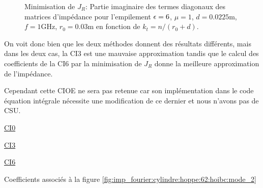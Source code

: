   \begin{figure}[!hbt]
    \centering
    
    \caption[CIOE sur empilement de Hoppe & Rahmat-Samii p.~62]{Minimisation de \(J_R\): Partie imaginaire des termes diagonaux des matrices d'impédance pour l'empilement \(\epsilon = 6\), \(\mu = 1\), \(d=0.0225\text{m}\), \(f=1\text{GHz}\), \(r_0=0.03\text{m}\) en fonction de \(k_t = n / (r_0+d)\).}
    \label{fig:imp_fourier:cylindre:hoppe:62:hoibc:mode_1}
  \end{figure}

  On voit donc bien que les deux méthodes donnent des résultats différents, mais dans les deux cas, la CI3 est une mauvaise approximation tandis que le calcul des coefficients de la CI6 par la minimisation de \(J_R\) donne la meilleure approximation de l'impédance.

  Cependant cette CIOE ne sera pas retenue car son implémentation dans le code équation intégrale nécessite une modification de ce dernier et nous n'avons pas de CSU.

  \begin{table}[!hbt]
    \centering
    \begin{minipage}[t]{0.49\textwidth}
      \vspace{0pt}
      \centering
      \begin{coefftable}{\hyperlink{ci0}{CI0}}
        
      \end{coefftable}
      \begin{coefftable}{\hyperlink{ci3}{CI3}}
        
      \end{coefftable}
    \end{minipage}
    \begin{minipage}[t]{0.49\textwidth}
      \vspace{0pt}
      \centering
      \begin{coefftable}{\hyperlink{ci6}{CI6}}
        
      \end{coefftable}
    \end{minipage}
    \caption{Coefficients associés à la figure \ref{fig:imp_fourier:cylindre:hoppe:62:hoibc:mode_2}}
    \label{tab:imp_fourier:cylindre:hoppe:62:hoibc:mode_2}
  \end{table}


